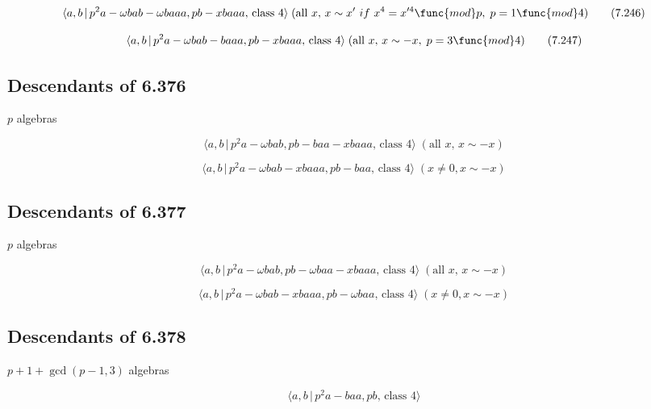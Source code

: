 \documentclass[10pt]{article}
\begin{document}
\begin{equation}
\langle a,b\,|\,p^{2}a-\omega bab-\omega baaa,pb-xbaaa,\,\text{class }%
4\rangle \;(\text{all }x,\,x\sim x^{\prime }\ if\ x^{4}=x^{\prime 4}\func{mod%
}p,\;p=1\func{mod}4)  \tag{7.246}
\end{equation}

\begin{equation}
\langle a,b\,|\,p^{2}a-\omega bab-baaa,pb-xbaaa,\,\text{class }4\rangle \;(%
\text{all }x,\,x\sim -x,\;p=3\func{mod}4)  \tag{7.247}
\end{equation}

\subsection{Descendants of 6.376}

$p$ algebras

\begin{equation}
\langle a,b\,|\,p^{2}a-\omega bab,pb-baa-xbaaa,\,\text{class }4\rangle \;(%
\text{all }x,\,x\sim -x)  \tag{7.248}
\end{equation}

\begin{equation}
\langle a,b\,|\,p^{2}a-\omega bab-xbaaa,pb-baa,\,\text{class }4\rangle
\;(x\neq 0,x\sim -x)  \tag{7.249}
\end{equation}

\subsection{Descendants of 6.377}

$p$ algebras

\begin{equation}
\langle a,b\,|\,p^{2}a-\omega bab,pb-\omega baa-xbaaa,\,\text{class }%
4\rangle \;(\text{all }x,\,x\sim -x)  \tag{7.250}
\end{equation}

\begin{equation}
\langle a,b\,|\,p^{2}a-\omega bab-xbaaa,pb-\omega baa,\,\text{class }%
4\rangle \;(x\neq 0,x\sim -x)  \tag{7.251}
\end{equation}

\subsection{Descendants of 6.378}

$p+1+\gcd (p-1,3)$ algebras

\begin{equation}
\langle a,b\,|\,p^2a-baa,pb,\,\text{class }4\rangle  \tag{7.252}
\end{equation}
\end{document}
